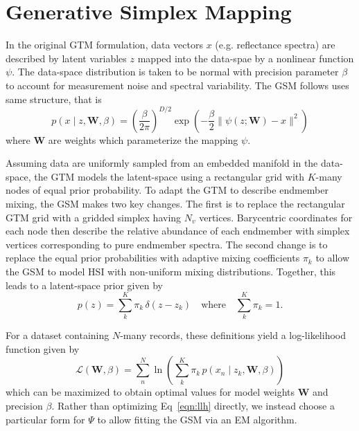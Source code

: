 \documentclass[remotesensing,article,submit,pdftex,moreauthors]{Definitions/mdpi}
\begin{document}
\section{Generative Simplex Mapping}\label{sec:gsm}

In the original GTM formulation, data vectors $x$ (e.g. reflectance spectra) are described by latent variables $z$ mapped into the data-spae by a nonlinear function $\psi$. The data-space distribution is taken to be normal with precision parameter $\beta$ to account for measurement noise and spectral variability. The GSM follows uses same structure, that is
\begin{equation}\label{eqn:data-space-distribution}
    p(x \mid z, \mathbf{W}, \beta) = \left(\frac{\beta}{2\pi} \right)^{D/2}\exp\left( -\frac{\beta}{2}\lVert \psi(z; \mathbf{W}) - x \rVert^2 \right)
\end{equation}
where $\mathbf{W}$ are weights which parameterize the mapping $\psi$.

Assuming data are uniformly sampled from an embedded manifold in the data-space, the GTM models the latent-space using a rectangular grid with $K$-many nodes of equal prior probability. To adapt the GTM to describe endmember mixing, the GSM makes two key changes. The first is to replace the rectangular GTM grid with a gridded simplex having $N_v$ vertices. Barycentric coordinates for each node then describe the relative abundance of each endmember with simplex vertices corresponding to pure endmember spectra. The second change is to replace the equal prior probabilities with adaptive mixing coefficients $\pi_k$ to allow the GSM to model HSI with non-uniform mixing distributions. Together, this leads to a latent-space prior given by
\begin{equation}\label{eqn:latent-distribution}
    p(z) = \sum\limits_k^K \pi_k \, \delta(z - z_k) \quad\text{where}\quad  \sum_k^K\pi_k = 1.
\end{equation}

For a dataset containing $N$-many records, these definitions yield a log-likelihood function given by
\begin{equation}\label{eqn:llh}
    \mathcal{L}(\mathbf{W}, \beta) = \sum\limits_n^N \ln \left( \sum\limits_k^K \pi_k \, p(x_n \mid z_k, \mathbf{W}, \beta) \right)
\end{equation}
which can be maximized to obtain optimal values for model weights $\mathbf{W}$ and precision $\beta$. Rather than optimizing Eq~\ref{eqn:llh} directly, we instead choose a particular form for $\Psi$ to allow fitting the GSM via an EM algorithm.
\end{document}
